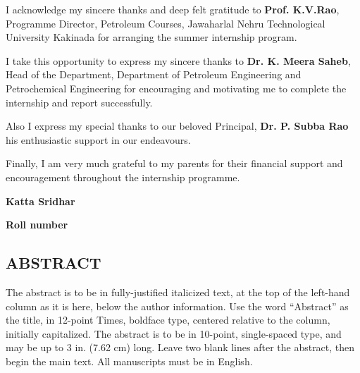 \documentclass[11pt,a4paper]{article}
\begin{document}
\vspace{1em}


I acknowledge my sincere thanks and deep felt gratitude to \textbf{Prof. K.V.Rao}, Programme Director, Petroleum Courses, Jawaharlal Nehru Technological University Kakinada for arranging the summer internship program.

\vspace{1em}

I take this opportunity to express my sincere thanks to \textbf{Dr. K. Meera Saheb}, Head of the Department, Department of Petroleum Engineering and Petrochemical Engineering for encouraging and motivating me to complete the internship and report successfully.

\vspace{1em}

Also I express my special thanks to our beloved Principal, \textbf{Dr. P. Subba Rao} his enthusiastic support in our endeavours.

\vspace{1em}

Finally, I am very much grateful to my parents for their financial support and encouragement throughout the internship programme.

\vspace{1em}

\hfill \textbf{Katta Sridhar}

\hfill \textbf{Roll number} \hspace{0.005\textwidth}
        
\newpage        
\tableofcontents



\newpage

\begin{center}
\section*{ABSTRACT}
\end{center}
  
The abstract is to be in fully-justified italicized text, at the top of the left-hand column as it is here, below the author information. Use the word “Abstract” as the title, in 12-point Times, boldface type, centered relative to the column, initially capitalized. The abstract is to be in 10-point, single-spaced type, and may be up to 3 in. (7.62 cm) long. Leave two blank lines after the abstract, then begin the main text. All manuscripts must be in English.
  
\end{document}
